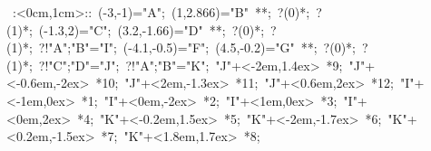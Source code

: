 %


\hbox{
\xy    <1cm,0cm>:<0cm,1cm>::
       (-3,-1)="A"; (1,2.866)="B" **\dir{-}; ?(0)*\dir{<}; ?(1)*\dir{>};
       (-1.3,2)="C"; (3.2,-1.66)="D" **\dir{-}; ?(0)*\dir{<}; ?(1)*\dir{>}; ?!{"A";"B"}="I";
       (-4.1,-0.5)="F"; (4.5,-0.2)="G" **\dir{-}; ?(0)*\dir{<}; ?(1)*\dir{>};
        ?!{"C";"D"}="J";  ?!{"A";"B"}="K";
       "J"+<-2em,1.4ex> *{9};
       "J"+<-0.6em,-2ex> *{10};
       "J"+<2em,-1.3ex> *{11};
       "J"+<0.6em,2ex> *{12};
       "I"+<-1em,0ex> *{1};
       "I"+<0em,-2ex> *{2};
       "I"+<1em,0ex> *{3};
       "I"+<0em,2ex> *{4};
       "K"+<-0.2em,1.5ex> *{5};
       "K"+<-2em,-1.7ex> *{6};
       "K"+<0.2em,-1.5ex> *{7};
       "K"+<1.8em,1.7ex> *{8};
\endxy}


